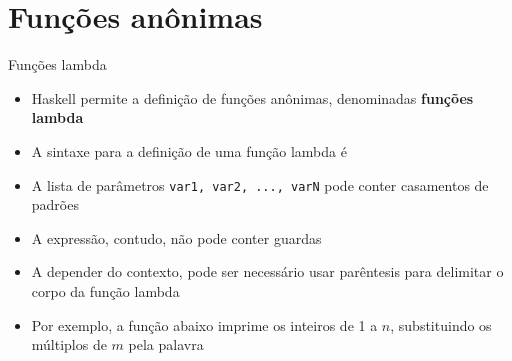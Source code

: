 \section{Funções anônimas}

\begin{frame}[fragile]{Funções lambda}

    \begin{itemize}
        \item Haskell permite a definição de funções anônimas, denominadas \textbf{funções lambda}

        \item A sintaxe para a definição de uma função lambda é


        \item A lista de parâmetros \texttt{var1, var2, ..., varN} pode conter casamentos de
            padrões

        \item A expressão, contudo, não pode conter guardas

        \item A depender do contexto, pode ser necessário usar parêntesis para delimitar o
            corpo da função lambda

        \item Por exemplo, a função abaixo imprime os inteiros de 1 a $n$, substituindo os 
            múltiplos de $m$ pela palavra 

    \end{itemize}

\end{frame}

